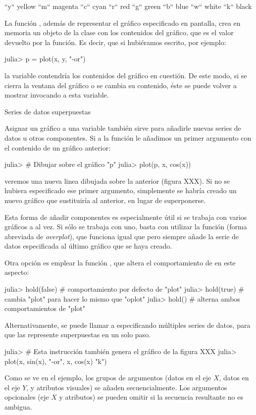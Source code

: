 ﻿\documentclass[spanish]{article}
\begin{document}
``y``     yellow
``m``     magenta
``c``     cyan
``r``     red
``g``     green
``b``     blue
``w``     white
``k``     black

La función , además de representar el gráfico especificado en pantalla, crea en memoria un objeto de la clase  con los contenidos del gráfico, que es el valor devuelto por la función. Es decir, que si hubiéramos escrito, por ejemplo:

julia> p = plot(x, y, "-or")

la variable  contendría los contenidos del gráfico en cuestión. De este modo, si se cierra la ventana del gráfico o se cambia su contenido, éste se puede volver a mostrar invocando a esta variable.


Series de datos superpuestas

Asignar un gráfico a una variable también sirve para añadirle nuevas series de datos u otros componentes. Si a la función  le añadimos un primer argumento con el contenido de un gráfico anterior:

julia> # Dibujar sobre el gráfico "p"
julia> plot(p, x, cos(x))

veremos una nueva linea dibujada sobre la anterior (figura XXX). Si no se hubiera especificado ese primer argumento, simplemente se habría creado un nuevo gráfico que sustituiría al anterior, en lugar de superponerse.

Esta forma de añadir componentes es especialmente útil si se trabaja con varios gráficos a al vez. Si sólo se trabaja con uno, basta con utilizar la función  (forma abreviada de \emph{overplot}), que funciona igual que  pero siempre añade la serie de datos especificada al último gráfico que se haya creado.

Otra opción es emplear la función , que altera el comportamiento de  en este aspecto:

julia> hold(false) # comportamiento por defecto de "plot"
julia> hold(true)  # cambia "plot" para hacer lo mismo que "oplot"
julia> hold()      # alterna ambos comportamientos de "plot"

Alternativamente, se puede llamar a  especificando múltiples series de datos, para que las represente superpuestas en un solo paso.

julia> # Esta instrucción también genera el gráfico de la figura XXX
julia> plot(x, sin(x), "-or", x, cos(x) "k")

Como se ve en el ejemplo, los grupos de argumentos (datos en el eje $X$, datos en el eje $Y$, y atributos visuales) se añaden secuencialmente. Los argumentos opcionales (eje $X$ y atributos) se pueden omitir si la secuencia resultante no es ambigua.
\end{document}
